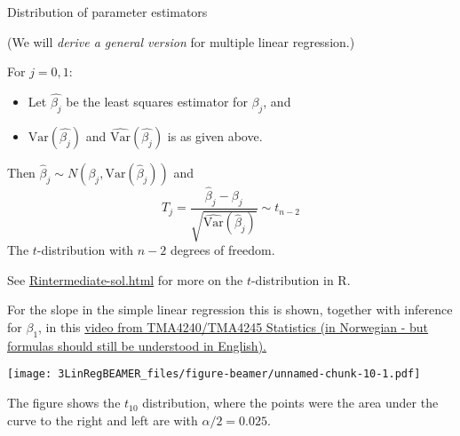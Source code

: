 \documentclass[ignorenonframetext,]{beamer}
\providecommand{\tightlist}{%
  \setlength{\itemsep}{0pt}\setlength{\parskip}{0pt}}
\begin{document}
\begin{frame}

\begin{block}{Distribution of parameter estimators}

(We will \emph{derive a general version} for multiple linear
regression.)

For \(j=0,1\):

\begin{itemize}
\tightlist
\item
  Let \(\hat{\beta_j}\) be the least squares estimator for \(\beta_j\),
  and
\item
  \(\text{Var}(\hat{\beta_j})\) and
  \(\widehat{\text{Var}}(\hat{\beta_j})\) is as given above.
\end{itemize}

Then \(\hat{\beta}_j \sim N(\beta_j,\text{Var}(\hat{\beta}_j))\) and
\[T_j =\frac{\hat{\beta}_j-\beta_j}{\sqrt{\widehat{\text{Var}}(\hat{\beta}_j)}} \sim t_{n-2}\]
The \(t\)-distribution with \(n-2\) degrees of freedom.

See
\href{https://wwww.math.ntnu.no/emner/TMA4268/2018v/1Intro/Rintermediate-sol.html}{Rintermediate-sol.html}
for more on the \(t\)-distribution in R.

For the slope in the simple linear regression this is shown, together
with inference for \(\beta_1\), in this
\href{https://mediasite.ntnu.no/Mediasite/Play/2e9a209c58874e75bd47e3c5e0b7b4e81d?catalog=0fce6173-7a98-4db7-84b7-50cba3a3a341}{video
from TMA4240/TMA4245 Statistics (in Norwegian - but formulas should
still be understood in English).}

\end{block}

\end{frame}

\begin{frame}

\texttt{[image: 3LinRegBEAMER\_files/figure-beamer/unnamed-chunk-10-1.pdf]}

The figure shows the \(t_{10}\) distribution, where the points were the
area under the curve to the right and left are with \(\alpha/2=0.025\).

\end{frame}
\end{document}
